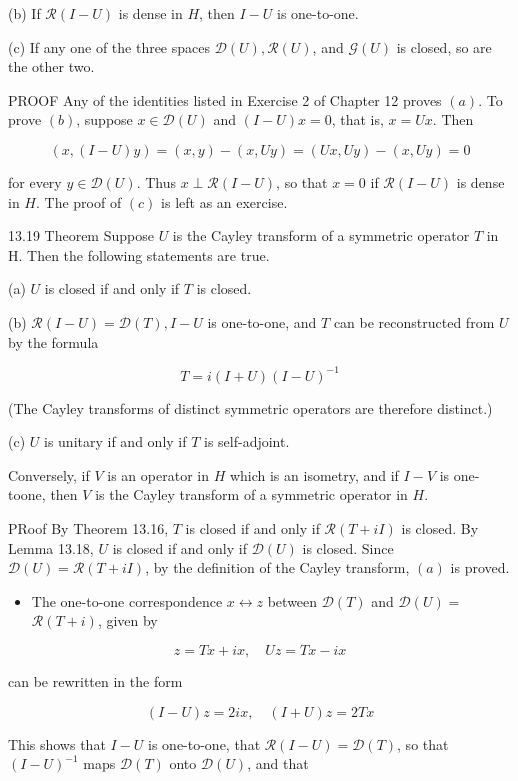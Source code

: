 \documentclass[10pt]{article}
\begin{document}
(b) If $\mathscr{R}(I-U)$ is dense in $H$, then $I-U$ is one-to-one.

(c) If any one of the three spaces $\mathscr{D}(U), \mathscr{R}(U)$, and $\mathscr{G}(U)$ is closed, so are the other two.

PROOF Any of the identities listed in Exercise 2 of Chapter 12 proves $(a)$. To prove $(b)$, suppose $x \in \mathscr{D}(U)$ and $(I-U) x=0$, that is, $x=U x$. Then

$$
(x,(I-U) y)=(x, y)-(x, U y)=(U x, U y)-(x, U y)=0
$$

for every $y \in \mathscr{D}(U)$. Thus $x \perp \mathscr{R}(I-U)$, so that $x=0$ if $\mathscr{R}(I-U)$ is dense in $H$. The proof of $(c)$ is left as an exercise.

13.19 Theorem Suppose $U$ is the Cayley transform of a symmetric operator $T$ in H. Then the following statements are true.

(a) $U$ is closed if and only if $T$ is closed.

(b) $\mathscr{R}(I-U)=\mathscr{D}(T), I-U$ is one-to-one, and $T$ can be reconstructed from $U$ by the formula

$$
T=i(I+U)(I-U)^{-1}
$$

(The Cayley transforms of distinct symmetric operators are therefore distinct.)

(c) $U$ is unitary if and only if $T$ is self-adjoint.

Conversely, if $V$ is an operator in $H$ which is an isometry, and if $I-V$ is one-toone, then $V$ is the Cayley transform of a symmetric operator in $H$.

PRoof By Theorem 13.16, $T$ is closed if and only if $\mathscr{R}(T+i I)$ is closed. By Lemma 13.18, $U$ is closed if and only if $\mathscr{D}(U)$ is closed. Since $\mathscr{D}(U)=\mathscr{R}(T+i I)$, by the definition of the Cayley transform, $(a)$ is proved.

\begin{itemize}
  \item The one-to-one correspondence $x \leftrightarrow z$ between $\mathscr{D}(T)$ and $\mathscr{D}(U)=$ $\mathscr{R}(T+i)$, given by
\end{itemize}

$$
z=T x+i x, \quad U z=T x-i x
$$

can be rewritten in the form

$$
(I-U) z=2 i x, \quad(I+U) z=2 T x
$$

This shows that $I-U$ is one-to-one, that $\mathscr{R}(I-U)=\mathscr{D}(T)$, so that $(I-U)^{-1}$ maps $\mathscr{D}(T)$ onto $\mathscr{D}(U)$, and that
\end{document}
